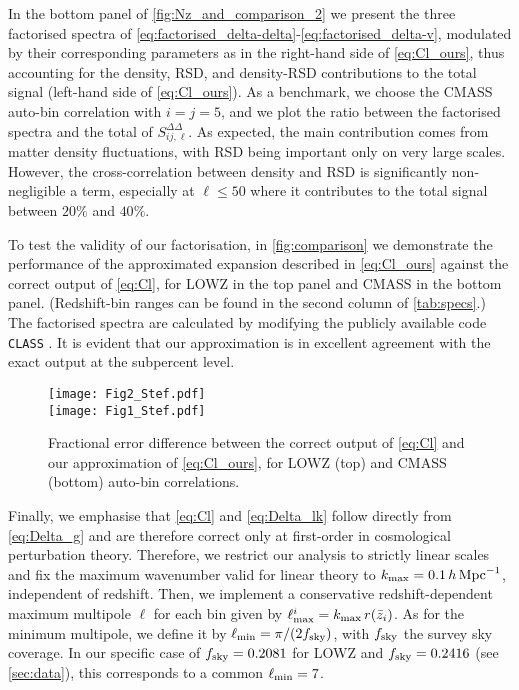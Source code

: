 \documentclass[astrosymb,twocolumn]{aastex631}
\begin{document}
In the bottom panel of \autoref{fig:Nz_and_comparison_2} we present the three factorised spectra of \autoref{eq:factorised_delta-delta}-\ref{eq:factorised_delta-v}, modulated by their corresponding parameters as in the right-hand side of \autoref{eq:Cl_ours}, thus accounting for the density, RSD, and density-RSD contributions to the total signal (left-hand side of \autoref{eq:Cl_ours}). As a benchmark, we choose the CMASS auto-bin correlation with \(i=j=5\), and we plot the ratio between the factorised spectra and the total of \(S^{\varDelta\varDelta}_{ij,\ell}\). As expected, the main contribution comes from matter density fluctuations, with RSD being important only on very large scales. However, the cross-correlation between density and RSD is significantly non-negligible a term, especially at \(\ell\le50\) where it contributes to the total signal between \(20\%\) and \(40\%\).

To test the validity of our factorisation, in \autoref{fig:comparison} we demonstrate the performance of the approximated expansion described in \autoref{eq:Cl_ours} against the correct output of \autoref{eq:Cl}, for LOWZ in the top panel and CMASS in the bottom panel. (Redshift-bin ranges can be found in the second column of \autoref{tab:specs}.) The factorised spectra are calculated by modifying the publicly available code \texttt{CLASS} \citep{Lesgourgues2011}. It is evident that our approximation is in excellent agreement with the exact output at the subpercent level.
\begin{figure}
    \centering
    \texttt{[image: Fig2\_Stef.pdf]}\\
    \texttt{[image: Fig1\_Stef.pdf]}    \caption{Fractional error difference between the correct output of \autoref{eq:Cl} and our approximation of \autoref{eq:Cl_ours}, for LOWZ (top) and CMASS (bottom) auto-bin correlations.}
    \label{fig:comparison}
\end{figure}

Finally, we emphasise that \autoref{eq:Cl} and \autoref{eq:Delta_lk} follow directly from \autoref{eq:Delta_g} and are therefore correct only at first-order in cosmological perturbation theory. Therefore, we restrict our analysis to strictly linear scales and fix the maximum wavenumber valid for linear theory to \(k_{\rm max}=0.1\,h\,\mathrm{Mpc}^{-1}\), independent of redshift. Then, we implement a conservative redshift-dependent maximum multipole \(\ell\) for each bin given by \(\ell_{\rm max}^i=k_{\rm max}\,r(\bar{z}_i)\). As for the minimum multipole, we define it by \(\ell_{\rm min}=\pi/(2f_{\rm sky})\), with \(f_{\rm sky}\) the survey sky coverage. In our specific case of \(f_{\rm sky}=0.2081\) for LOWZ and \(f_{\rm sky}=0.2416\) (see \autoref{sec:data}), this corresponds to a common \(\ell_{\rm min}=7\).
\end{document}
